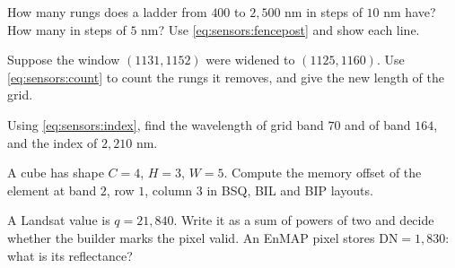 \begin{checkyourself}
\item\label{ex:sensors:1} How many rungs does a ladder from $400$ to $2{,}500$ nm in steps of
$10$ nm have? How many in steps of $5$ nm? Use \cref{eq:sensors:fencepost} and show each line.
\item\label{ex:sensors:2} Suppose the window $(1131, 1152)$ were widened to $(1125, 1160)$. Use
\cref{eq:sensors:count} to count the rungs it removes, and give the new length of the grid.
\item\label{ex:sensors:3} Using \cref{eq:sensors:index}, find the wavelength of grid band $70$ and
of band $164$, and the index of $2{,}210$ nm.
\item\label{ex:sensors:4} A cube has shape $C = 4$, $H = 3$, $W = 5$. Compute the memory offset of
the element at band $2$, row $1$, column $3$ in BSQ, BIL and BIP layouts.
\item\label{ex:sensors:5} A Landsat  value is $q = 21{,}840$. Write it as a sum of
powers of two and decide whether the builder marks the pixel valid. An EnMAP pixel stores
$\mathrm{DN} = 1{,}830$: what is its reflectance?
\end{checkyourself}

